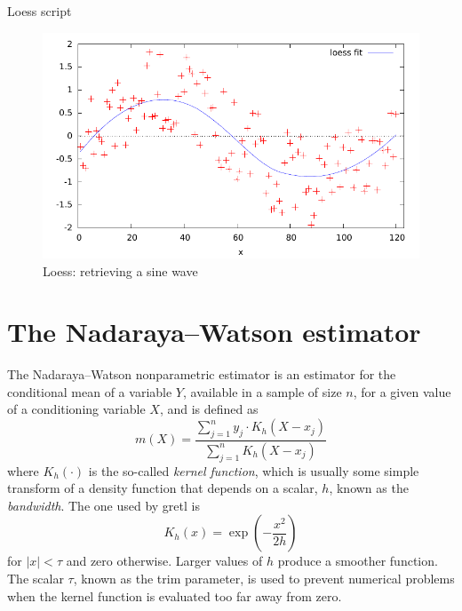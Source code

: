 \begin{script}[htbp]
  \caption{Loess script}
  \label{scr:loess-sine}
\end{script}

\begin{figure}[htbp]
  \centering
  \includegraphics[scale=0.75]{figures/loess-sine}
  \caption{Loess: retrieving a sine wave}
  \label{fig:loess-sine}
\end{figure}

\section{The Nadaraya--Watson estimator}
\label{sec:nadarwat}

The Nadaraya--Watson nonparametric estimator \citep{nadaraya64,
  watson64} is an estimator for the conditional mean of a variable
$Y$, available in a sample of size $n$, for a given value of a
conditioning variable $X$, and is defined as
\[
  m(X) = \frac{ \sum_{j=1}^{n} y_j \cdot K_h(X - x_j)} {\sum_{j=1}^{n} K_h(X - x_j)}
\]
where $K_h(\cdot)$ is the so-called \emph{kernel function}, which is
usually some simple transform of a density function that depends on a
scalar, $h$, known as the \emph{bandwidth}. The one used by gretl
is
\[
  K_h(x) = \exp\left(-\frac{x^2}{2h}\right)
\]
for $|x| < \tau$ and zero otherwise. Larger values of $h$ produce a
smoother function.  The scalar $\tau$, known as the trim parameter, is
used to prevent numerical problems when the kernel function is
evaluated too far away from zero.

